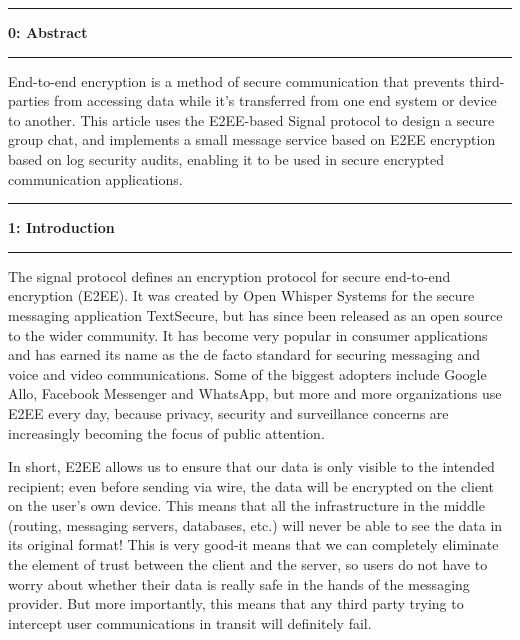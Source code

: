 \documentclass[11pt]{article}
\newcommand\question[2]{\vspace{.25in}\hrule\textbf{#1: #2}\vspace{.5em}\hrule\vspace{.10in}}
\begin{document}
\raggedright
\newcommand\NAME{Yao Xiao}  %
\newcommand\ANDREWID{2019180015}     %
\newcommand\HWNUM{1}              %


\question{0}{Abstract}
End-to-end encryption is a method of secure communication that prevents third-parties from accessing data while it's transferred from one end system or device to another.
This article uses the E2EE-based Signal protocol to design a secure group chat, and implements a small message service based on E2EE encryption based on log security audits, enabling it to be used in secure encrypted communication applications.


\question{1}{Introduction} 

The signal protocol defines an encryption protocol for secure end-to-end encryption (E2EE). It was created by Open Whisper Systems for the secure messaging application TextSecure, but has since been released as an open source to the wider community. It has become very popular in consumer applications and has earned its name as the de facto standard for securing messaging and voice and video communications. Some of the biggest adopters include Google Allo, Facebook Messenger and WhatsApp, but more and more organizations use E2EE every day, because privacy, security and surveillance concerns are increasingly becoming the focus of public attention.

In short, E2EE allows us to ensure that our data is only visible to the intended recipient; even before sending via wire, the data will be encrypted on the client on the user's own device. This means that all the infrastructure in the middle (routing, messaging servers, databases, etc.) will never be able to see the data in its original format! This is very good-it means that we can completely eliminate the element of trust between the client and the server, so users do not have to worry about whether their data is really safe in the hands of the messaging provider. But more importantly, this means that any third party trying to intercept user communications in transit will definitely fail.
\end{document}
